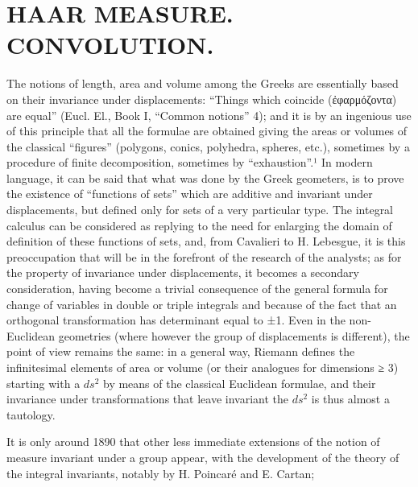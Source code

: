 \chapter{HAAR MEASURE. CONVOLUTION.}

The notions of length, area and volume among the Greeks are essentially based on their invariance under displacements: ``Things which coincide (ἐφαρμόζοντα) are equal'' (Eucl. El., Book I, ``Common notions'' 4); and it is by an ingenious use of this principle that all the formulae are obtained giving the areas or volumes of the classical ``figures'' (polygons, conics, polyhedra, spheres, etc.), sometimes by a procedure of finite decomposition, sometimes by ``exhaustion''.¹ In modern language, it can be said that what was done by the Greek geometers, is to prove the existence of ``functions of sets'' which are additive and invariant under displacements, but defined only for sets of a very particular type. The integral calculus can be considered as replying to the need for enlarging the domain of definition of these functions of sets, and, from Cavalieri to H. Lebesgue, it is this preoccupation that will be in the forefront of the research of the analysts; as for the property of invariance under displacements, it becomes a secondary consideration, having become a trivial consequence of the general formula for change of variables in double or triple integrals and because of the fact that an orthogonal transformation has determinant equal to ±1. Even in the non-Euclidean geometries (where however the group of displacements is different), the point of view remains the same: in a general way, Riemann defines the infinitesimal elements of area or volume (or their analogues for dimensions ≥ 3) starting with a \(ds^2\) by means of the classical Euclidean formulae, and their invariance under transformations that leave invariant the \(ds^2\) is thus almost a tautology.

It is only around 1890 that other less immediate extensions of the notion of measure invariant under a group appear, with the development of the theory of the integral invariants, notably by H. Poincaré and E. Cartan;

